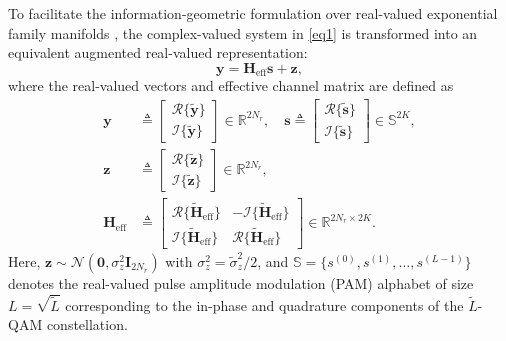 \documentclass[conference]{IEEEtran}
\begin{document}
To facilitate the information-geometric formulation over real-valued exponential family manifolds \cite{b1}, the complex-valued system in \eqref{eq1} is transformed into an equivalent augmented real-valued representation:
\begin{equation}
	\mathbf{y} = \mathbf{H}_{\mathrm{eff}} \mathbf{s} + \mathbf{z}, \label{eq_real_sys}
\end{equation}
where the real-valued vectors and effective channel matrix are defined as
\begin{align}
	\mathbf{y} &\triangleq \begin{bmatrix}
		\mathcal{R}\{\tilde{\mathbf{y}}\} \\
		\mathcal{I}\{\tilde{\mathbf{y}}\}
	\end{bmatrix} \in \mathbb{R}^{2N_r}, \quad
	\mathbf{s} \triangleq \begin{bmatrix}
		\mathcal{R}\{\tilde{\mathbf{s}}\} \\
		\mathcal{I}\{\tilde{\mathbf{s}}\}
	\end{bmatrix} \in \mathbb{S}^{2K},  \nonumber \\
	\mathbf{z} &\triangleq \begin{bmatrix}
		\mathcal{R}\{\tilde{\mathbf{z}}\} \\
		\mathcal{I}\{\tilde{\mathbf{z}}\}
	\end{bmatrix} \in \mathbb{R}^{2N_r},  \nonumber \\
	\mathbf{H}_\mathrm{eff} &\triangleq \begin{bmatrix}
		\mathcal{R}\{\tilde{\mathbf{H}}_\mathrm{eff}\} & -\mathcal{I}\{\tilde{\mathbf{H}}_\mathrm{eff}\} \\
		\mathcal{I}\{\tilde{\mathbf{H}}_\mathrm{eff}\} & \mathcal{R}\{\tilde{\mathbf{H}}_\mathrm{eff}\}
	\end{bmatrix} \in \mathbb{R}^{2N_r \times 2K}. \label{eq:real_aug}
\end{align}
Here, $\mathbf{z} \sim \mathcal{N}(\mathbf{0}, \sigma_z^2 \mathbf{I}_{2N_r})$ with $\sigma_z^2 = \tilde{\sigma}_z^2 / 2$, and $\mathbb{S} = \{s^{(0)}, s^{(1)}, \dots, s^{(L-1)}\}$ denotes the real-valued pulse amplitude modulation (PAM) alphabet of size $L = \sqrt{\tilde{L}}$ corresponding to the in-phase and quadrature components of the $\tilde{L}$-QAM constellation.
\end{document}
